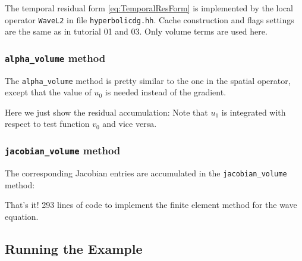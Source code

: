 \documentclass[a4paper,12pt]{article}
\theoremstyle{definition}
\theoremstyle{definition}
\begin{document}
The temporal residual form \eqref{eq:TemporalResForm} is
implemented by the local operator \lstinline{WaveL2} in
file \lstinline{hyperbolicdg.hh}. Cache construction and flags settings
are the same as in tutorial 01 and 03. Only volume terms are used here.

\subsubsection*{\lstinline{alpha_volume} method}

The \lstinline{alpha_volume} method is pretty similar
to the one in the spatial operator, except that the value of $u_0$
is needed instead of the gradient.

Here we just show the residual accumulation:
%
Note that $u_1$ is integrated with respect to test function $v_0$
and vice versa.

\subsubsection*{\lstinline{jacobian_volume} method}

The corresponding Jacobian entries are accumulated in the
\lstinline{jacobian_volume} method:
%

That's it! 293 lines of code to implement the finite element method for
the wave equation.

\subsection{Running the Example}


\end{document}
